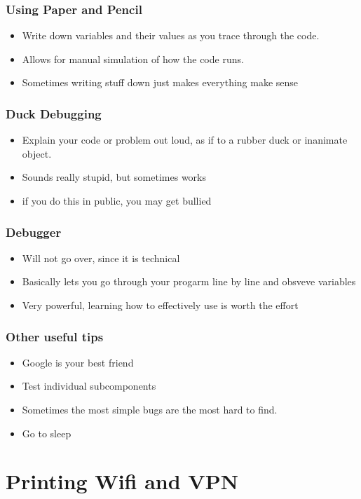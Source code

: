 \documentclass[aspectratio=169,hyperref={unicode}]{beamer}
\begin{document}
\begin{frame}
\frametitle{Using Paper and Pencil}
\begin{itemize}
\item Write down variables and their values as you trace through the code.
\item Allows for manual simulation of how the code runs.
\item Sometimes writing stuff down just makes everything make sense
\end{itemize}
\end{frame}

\begin{frame}
\frametitle{Duck Debugging}
\begin{itemize}
\item Explain your code or problem out loud, as if to a rubber duck or inanimate object.
        \item Sounds really stupid, but sometimes works
        \item if you do this in public, you may get bullied
\end{itemize}
\end{frame}



\begin{frame}
\frametitle{Debugger}
\begin{itemize}
        \item Will not go over, since it is technical
        \item Basically lets you go through your progarm line by line and obsveve variables
        \item Very powerful, learning how to effectively use is worth the effort
\end{itemize}
\end{frame}

\begin{frame}
\frametitle{Other useful tips}
\begin{itemize}
\item Google is your best friend
\item Test individual subcomponents
        \item Sometimes the most simple bugs are the most hard to find.
\item Go to sleep
\end{itemize}
\end{frame}

\section{Printing Wifi and VPN}
\end{document}
